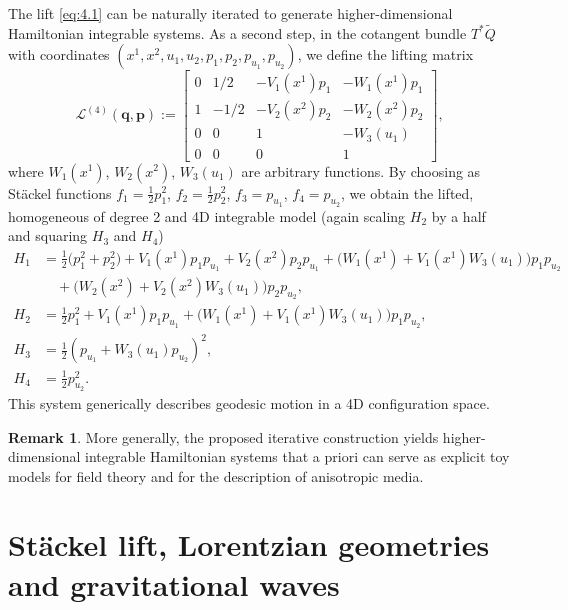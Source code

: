\documentclass[10pt]{amsart}
\numberwithin{equation}{section}
\newcommand{\bs}{\boldsymbol}
\theoremstyle{definition}
\newtheorem{remark}{\textbf{Remark}}
\begin{document}
	
	The lift \eqref{eq:4.1} can be naturally iterated to generate higher-dimensional Hamiltonian integrable systems. As a second step, in the cotangent bundle $T^{ *}\tilde{Q}$ with coordinates $(x^1,x^2,u_1,u_2, p_1,p_2,p_{u_1},p_{u_2})$, we define the lifting matrix
	\begin{equation}
		\mathcal{L}^{(4)}(\bs{q},\bs{p}):=
		\begin{bmatrix}
			0 & 1/2 & -V_1(x^1) p_1 & -W_{1}(x^1) p_1 \\ 1 & -1/2 & -V_2(x^2)p_2 & -W_{2}(x^2) p_2 \\ 0 & 0 & 1 & -W_{3}(u_1) \\ 0 & 0 & 0 & 1
		\end{bmatrix},
	\end{equation}
	where $W_{1}(x^1)$, $W_{2}(x^2)$, $W_{3}(u_1)$ are arbitrary functions.
	By choosing as St\"ackel functions $f_1= \frac{1}{2}p_1^2$, $f_2=\frac{1}{2}p_2^2$, $f_3= p_{u_1}$, $f_4= p_{u_2}$, we obtain the lifted, homogeneous of degree 2 and 4D integrable model (again scaling $H_2$ by a half and squaring $H_3$ and $H_4$)
	\begin{equation}
		\begin{split}
			H_1 &= \frac{1}{2}\big(p_1^2+p_2^2\big) + V_1(x^1) p_1 p_{u_1} + V_2(x^2) p_2 p_{u_1} +\big(W_{1}(x^1)+ V_1(x^1) W_{3}(u_1) \big) p_1 p_{u_2} \\
			&\quad +\big(W_{2}(x^2)+ V_2(x^2) W_{3}(u_1) \big) p_2 p_{u_2}, \\
			H_2 &= \frac{1}{2} p_1^2 + V_1(x^1) p_1 p_{u_1} +\big(W_{1}(x^1)+ V_1(x^1) W_{3}(u_1) \big) p_1 p_{u_2}, \\
			H_3 &= \frac{1}{2} (p_{u_1}+W_{3}(u_1)p_{u_2})^2, \\
			H_4 &= \frac{1}{2} p_{u_2}^2.
		\end{split}
	\end{equation}
This system generically describes geodesic motion in a 4D configuration space.

\begin{remark}
	More generally, the proposed iterative construction yields higher-dimensional integrable Hamiltonian systems that a priori can serve as explicit toy models for field theory and for the description of anisotropic media.
\end{remark}

\section{St\"ackel lift, Lorentzian geometries and gravitational waves} \label{sec:6}
\end{document}
